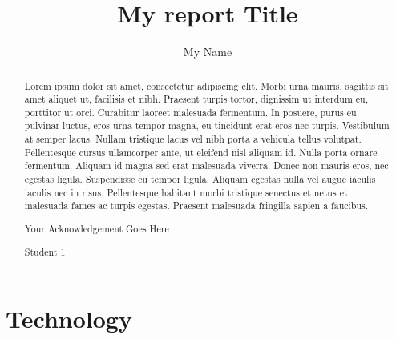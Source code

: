 \documentclass{fisattraining}
\title{My report Title}
\author{My Name}
\begin{document}
\maketitle
\makecert

\newpage
{}
\setcounter{page}{1}
\thispagestyle{plain}
\renewcommand\abstractname{Company Profile}
\begin{abstract}
\vspace{5cm}
Lorem ipsum dolor sit amet, consectetur adipiscing elit. Morbi urna mauris, sagittis sit amet aliquet ut, facilisis et nibh. Praesent turpis tortor, dignissim ut interdum eu, porttitor ut orci. Curabitur laoreet malesuada fermentum. In posuere, purus eu pulvinar luctus, eros urna tempor magna, eu tincidunt erat eros nec turpis. Vestibulum at semper lacus. Nullam tristique lacus vel nibh porta a vehicula tellus volutpat. Pellentesque cursus ullamcorper ante, ut eleifend nisl aliquam id. Nulla porta ornare fermentum. Aliquam id magna sed erat malesuada viverra. Donec non mauris eros, nec egestas ligula. Suspendisse eu tempor ligula. Aliquam egestas nulla vel augue iaculis iaculis nec in risus. Pellentesque habitant morbi tristique senectus et netus et malesuada fames ac turpis egestas. Praesent malesuada fringilla sapien a faucibus.
\end{abstract}


\newpage
\renewcommand\abstractname{ACKNOWLEDGMENT}
\thispagestyle{plain}
\begin{abstract}
\vspace{5cm}
Your Acknowledgement Goes Here
\vspace{1cm}
\begin{flushright}
Student 1
\end{flushright}
\end{abstract}
\newpage

\restoregeometry
\tableofcontents
\newpage

\cleardoublepage
{}
\listoffigures
\newpage

\cleardoublepage
{}
\listoftables
\newpage



\chapter{Technology}
\setcounter{page}{1}
\renewcommand{\baselinestretch}{1.50}
\end{document}

